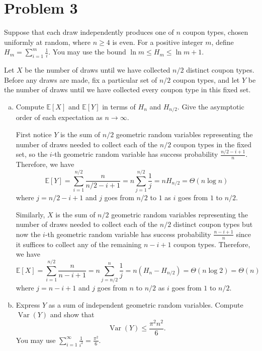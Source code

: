 \documentclass[12pt,letterpaper]{article}
\newcommand{\E}{\mathbb{E}}
\begin{document}
\section*{Problem 3}

Suppose that each draw independently produces one of $n$ coupon types, chosen uniformly at random, where $n\geq 4$ is even. For a positive integer $m$, define $H_m=\sum_{i=1}^{m}\frac{1}{i}$. You may use the bound $\ln m\leq H_m\leq \ln m+1$.

Let $X$ be the number of draws until we have collected $n/2$ distinct coupon types. Before any draws are made, fix a particular set of $n/2$ coupon types, and let $Y$ be the number of draws until we have collected every coupon type in this fixed set.

\begin{enumerate}[a.]
    \item Compute $\mathbb{E}[X]$ and $\mathbb{E}[Y]$ in terms of $H_n$ and $H_{n/2}$. Give the asymptotic order of each expectation as $n\to\infty$.
    
    \color{darkblue}
        First notice $Y$ is the sum of $n/2$ geometric random variables representing the number of draws needed to collect each of the $n/2$ coupon types in the fixed set, so the $i$-th geometric random variable has success probability $\frac{n/2-i+1}{n}$. Therefore, we have
        \[\E[Y] = \sum_{i=1}^{n/2} \frac{n}{n/2-i+1} = n\sum_{j=1}^{n/2} \frac{1}{j} = nH_{n/2} = \Theta(n\log n)\]
        where $j = n/2-i+1$ and $j$ goes from $n/2$ to $1$ as $i$ goes from $1$ to $n/2$.

        Similarly, $X$ is the sum of $n/2$ geometric random variables representing the number of draws needed to collect each of the $n/2$ distinct coupon types but now the $i$-th geometric random variable has success probability $\frac{n-i+1}{n}$ since it suffices to collect any of the remaining $n-i+1$ coupon types. Therefore, we have
        \[\E[X] = \sum_{i=1}^{n/2} \frac{n}{n-i+1} = n\sum_{j=n/2}^{n} \frac{1}{j} = n(H_n - H_{n/2}) = \Theta(n\log 2) = \Theta(n)\]
        where $j = n-i+1$ and $j$ goes from $n$ to $n/2$ as $i$ goes from $1$ to $n/2$.

    \color{black}


    \item Express $Y$ as a sum of independent geometric random variables. Compute $\operatorname{Var}(Y)$ and show that
    \[
    \operatorname{Var}(Y)\leq \frac{\pi^2 n^2}{6}.
    \]
    You may use $\sum_{i=1}^{\infty}\frac{1}{i^2}=\frac{\pi^2}{6}$.


\end{enumerate}
\end{document}
